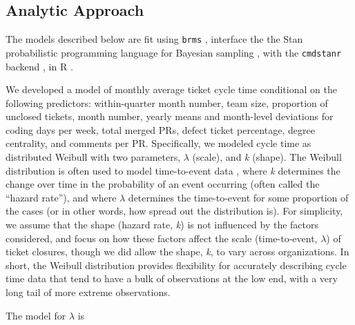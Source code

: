 \documentclass[
  sn-mathphys-ay,
]{sn-jnl}
\begin{document}
\subsection{Analytic Approach}\label{analytic-approach}

The models described below are fit using \texttt{brms}
\citep[v2.21.6,][]{burknerAdvancedBayesianMultilevel2018, burknerBrmsPackageBayesian2017},
interface the the Stan probabilistic programming language for Bayesian
sampling \citep[v2.35.0,][]{gelman}, with the \texttt{cmdstanr} backend
\citep[v0.8.0,][]{gabryCmdstanrInterfaceCmdStan2024}, in R
\citep[v4.3.2,][]{rcoreteamLanguageEnvironmentStatistical2023}.

We developed a model of monthly average ticket cycle time conditional on
the following predictors: within-quarter month number, team size,
proportion of unclosed tickets, month number, yearly means and
month-level deviations for coding days per week, total merged PRs,
defect ticket percentage, degree centrality, and comments per PR.
Specifically, we modeled cycle time as distributed Weibull with two
parameters, \(\lambda\) (scale), and \emph{k} (shape). The Weibull
distribution is often used to model time-to-event data
\citep{harrellRegressionModelingStrategies2015, rummelAverageWeibullAnalysis2017},
where \emph{k} determines the change over time in the probability of an
event occurring (often called the ``hazard rate''), and where
\(\lambda\) determines the time-to-event for some proportion of the
cases (or in other words, how spread out the distribution is). For
simplicity, we assume that the shape (hazard rate, \emph{k}) is not
influenced by the factors considered, and focus on how these factors
affect the scale (time-to-event, \(\lambda\)) of ticket closures, though
we did allow the shape, \emph{k}, to vary across organizations. In
short, the Weibull distribution provides flexibility for accurately
describing cycle time data that tend to have a bulk of observations at
the low end, with a very long tail of more extreme observations.

The model for \(\lambda\) is
\end{document}
